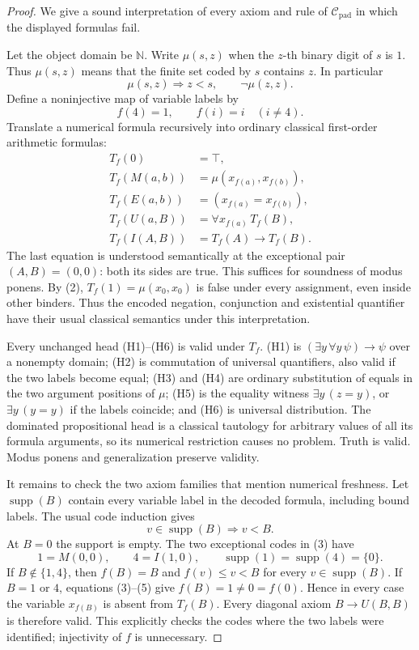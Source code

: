\begin{proof}
We give a sound interpretation of every axiom and rule of
$\mathcal C_{\mathrm{pad}}$ in which the displayed formulas fail.

Let the object domain be $\mathbb N$. Write $\mu(s,z)$ when the $z$-th
binary digit of $s$ is $1$. Thus $\mu(s,z)$ means that the finite set
coded by $s$ contains $z$. In particular
\[
 \mu(s,z)\Longrightarrow z<s,
 \qquad \neg\mu(z,z).
 \tag{2}
\]
Define a noninjective map of variable labels by
\[
 f(4)=1,\qquad f(i)=i\quad(i\ne4).
 \tag{3}
\]
Translate a numerical formula recursively into ordinary classical
first-order arithmetic formulas:
\begin{align*}
 T_f(0)&=\top,\\
 T_f(M(a,b))&=\mu(x_{f(a)},x_{f(b)}),\\
 T_f(E(a,b))&=(x_{f(a)}=x_{f(b)}),\\
 T_f(U(a,B))&=\forall x_{f(a)}\,T_f(B),\\
 T_f(I(A,B))&=T_f(A)\to T_f(B).
\end{align*}
The last equation is understood semantically at the exceptional pair
$(A,B)=(0,0)$: both its sides are true. This suffices for soundness of
modus ponens. By (2), $T_f(1)=\mu(x_0,x_0)$ is false under every
assignment, even inside other binders. Thus the encoded negation,
conjunction and existential quantifier have their usual classical
semantics under this interpretation.

Every unchanged head (H1)--(H6) is valid under $T_f$. (H1) is
$(\exists y\,\forall y\,\psi)\to\psi$ over a nonempty domain;
(H2) is commutation of universal quantifiers, also valid if the two
labels become equal; (H3) and (H4) are ordinary substitution of equals
in the two argument positions of $\mu$; (H5) is the equality witness
$\exists y\,(z=y)$, or $\exists y\,(y=y)$ if the labels coincide;
and (H6) is universal distribution. The dominated propositional head
is a classical tautology for arbitrary values of all its formula
arguments, so its numerical restriction causes no problem. Truth is
valid. Modus ponens and generalization preserve validity.

It remains to check the two axiom families that mention numerical
freshness. Let $\operatorname{supp}(B)$ contain every variable label in
the decoded formula, including bound labels. The usual code induction
gives
\[
 v\in\operatorname{supp}(B)\Longrightarrow v<B.
 \tag{4}
\]
At $B=0$ the support is empty. The two exceptional codes in (3) have
\[
 1=M(0,0),\qquad 4=I(1,0),\qquad
 \operatorname{supp}(1)=\operatorname{supp}(4)=\{0\}.
 \tag{5}
\]
If $B\notin\{1,4\}$, then $f(B)=B$ and $f(v)\le v<B$ for every
$v\in\operatorname{supp}(B)$. If $B=1$ or $4$, equations (3)--(5)
give $f(B)=1\ne0=f(0)$. Hence in every case the variable
$x_{f(B)}$ is absent from $T_f(B)$. Every diagonal axiom
$B\to U(B,B)$ is therefore valid. This explicitly checks the codes
where the two labels were identified; injectivity of $f$ is unnecessary.


\end{proof}
